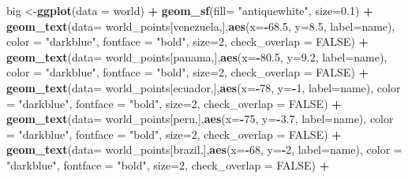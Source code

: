 \documentclass[12pt,oneside]{reedthesis}
\newenvironment{Shaded}{\begin{snugshade}}{\end{snugshade}}
\newcommand{\DataTypeTok}[1]{\textcolor[rgb]{0.13,0.29,0.53}{#1}}
\newcommand{\DecValTok}[1]{\textcolor[rgb]{0.00,0.00,0.81}{#1}}
\newcommand{\FloatTok}[1]{\textcolor[rgb]{0.00,0.00,0.81}{#1}}
\newcommand{\KeywordTok}[1]{\textcolor[rgb]{0.13,0.29,0.53}{\textbf{#1}}}
\newcommand{\NormalTok}[1]{#1}
\newcommand{\OperatorTok}[1]{\textcolor[rgb]{0.81,0.36,0.00}{\textbf{#1}}}
\newcommand{\OtherTok}[1]{\textcolor[rgb]{0.56,0.35,0.01}{#1}}
\newcommand{\StringTok}[1]{\textcolor[rgb]{0.31,0.60,0.02}{#1}}
\begin{document}
\begin{Shaded}
\begin{Highlighting}[]
{{{{\NormalTok{big <-}\KeywordTok{ggplot}\NormalTok{(}\DataTypeTok{data =}\NormalTok{ world) }\OperatorTok{+}\StringTok{ }
\StringTok{  }\KeywordTok{geom_sf}\NormalTok{(}\DataTypeTok{fill=} \StringTok{"antiquewhite"}\NormalTok{,  }\DataTypeTok{size=}\FloatTok{0.1}\NormalTok{) }\OperatorTok{+}\StringTok{ }
\StringTok{  }\KeywordTok{geom_text}\NormalTok{(}\DataTypeTok{data=}\NormalTok{ world_points[venezuela,],}\KeywordTok{aes}\NormalTok{(}\DataTypeTok{x=}\OperatorTok{-}\FloatTok{68.5}\NormalTok{, }\DataTypeTok{y=}\FloatTok{8.5}\NormalTok{, }\DataTypeTok{label=}\NormalTok{name), }\DataTypeTok{color =} \StringTok{"darkblue"}\NormalTok{, }\DataTypeTok{fontface =} \StringTok{"bold"}\NormalTok{, }\DataTypeTok{size=}\DecValTok{2}\NormalTok{, }\DataTypeTok{check_overlap =} \OtherTok{FALSE}\NormalTok{) }\OperatorTok{+}
\StringTok{  }\KeywordTok{geom_text}\NormalTok{(}\DataTypeTok{data=}\NormalTok{ world_points[panama,],}\KeywordTok{aes}\NormalTok{(}\DataTypeTok{x=}\OperatorTok{-}\FloatTok{80.5}\NormalTok{, }\DataTypeTok{y=}\FloatTok{9.2}\NormalTok{, }\DataTypeTok{label=}\NormalTok{name), }\DataTypeTok{color =} \StringTok{"darkblue"}\NormalTok{, }\DataTypeTok{fontface =} \StringTok{"bold"}\NormalTok{, }\DataTypeTok{size=}\DecValTok{2}\NormalTok{, }\DataTypeTok{check_overlap =} \OtherTok{FALSE}\NormalTok{) }\OperatorTok{+}\StringTok{ }
\StringTok{  }\KeywordTok{geom_text}\NormalTok{(}\DataTypeTok{data=}\NormalTok{ world_points[ecuador,],}\KeywordTok{aes}\NormalTok{(}\DataTypeTok{x=}\OperatorTok{-}\DecValTok{78}\NormalTok{, }\DataTypeTok{y=}\OperatorTok{-}\DecValTok{1}\NormalTok{, }\DataTypeTok{label=}\NormalTok{name), }\DataTypeTok{color =} \StringTok{"darkblue"}\NormalTok{, }\DataTypeTok{fontface =} \StringTok{"bold"}\NormalTok{, }\DataTypeTok{size=}\DecValTok{2}\NormalTok{, }\DataTypeTok{check_overlap =} \OtherTok{FALSE}\NormalTok{) }\OperatorTok{+}
\StringTok{  }\KeywordTok{geom_text}\NormalTok{(}\DataTypeTok{data=}\NormalTok{ world_points[peru,],}\KeywordTok{aes}\NormalTok{(}\DataTypeTok{x=}\OperatorTok{-}\DecValTok{75}\NormalTok{, }\DataTypeTok{y=}\OperatorTok{-}\FloatTok{3.7}\NormalTok{, }\DataTypeTok{label=}\NormalTok{name), }\DataTypeTok{color =} \StringTok{"darkblue"}\NormalTok{, }\DataTypeTok{fontface =} \StringTok{"bold"}\NormalTok{, }\DataTypeTok{size=}\DecValTok{2}\NormalTok{, }\DataTypeTok{check_overlap =} \OtherTok{FALSE}\NormalTok{) }\OperatorTok{+}
\StringTok{  }\KeywordTok{geom_text}\NormalTok{(}\DataTypeTok{data=}\NormalTok{ world_points[brazil,],}\KeywordTok{aes}\NormalTok{(}\DataTypeTok{x=}\OperatorTok{-}\DecValTok{68}\NormalTok{, }\DataTypeTok{y=}\OperatorTok{-}\DecValTok{2}\NormalTok{, }\DataTypeTok{label=}\NormalTok{name), }\DataTypeTok{color =} \StringTok{"darkblue"}\NormalTok{, }\DataTypeTok{fontface =} \StringTok{"bold"}\NormalTok{, }\DataTypeTok{size=}\DecValTok{2}\NormalTok{, }\DataTypeTok{check_overlap =} \OtherTok{FALSE}\NormalTok{) }\OperatorTok{+}
}}}}
\end{Highlighting}
\end{Shaded}
\end{document}
